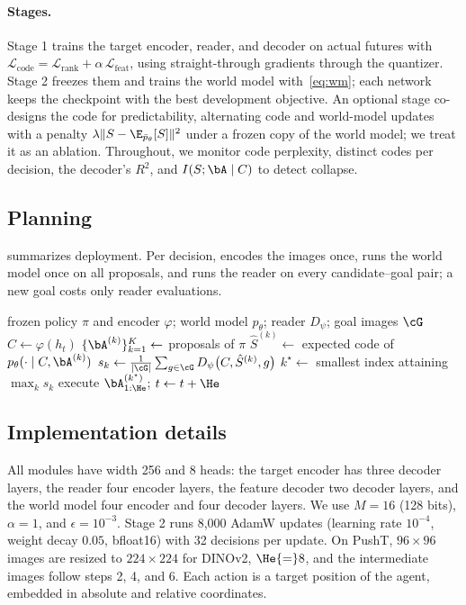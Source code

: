 \paragraph{Stages.}
Stage 1 trains the target encoder, reader, and decoder on actual futures with $\mathcal{L}_{\mathrm{code}}=\mathcal{L}_{\mathrm{rank}}+\alpha\,\mathcal{L}_{\mathrm{feat}}$, using straight-through gradients through the quantizer.
Stage 2 freezes them and trains the world model with~\eqref{eq:wm}; each network keeps the checkpoint with the best development objective.
An optional stage co-designs the code for predictability, alternating code and world-model updates with a penalty $\lambda\lVert S-\E_{\bar p_\theta}[S]\rVert^2$ under a frozen copy of the world model; we treat it as an ablation.
Throughout, we monitor code perplexity, distinct codes per decision, the decoder's $R^2$, and $I(S;\bA\mid C)$ to detect collapse.

\subsection{Planning}
\label{sec:planning}
 summarizes deployment.
Per decision, \method encodes the images once, runs the world model once on all proposals, and runs the reader on every candidate--goal pair; a new goal costs only reader evaluations.

\begin{algorithm}[t]
\caption{Selecting policy proposals with \method.}
\label{alg:cta}
\small
\begin{algorithmic}[1]
\Require frozen policy $\pi$ and encoder $\varphi$; world model $p_\theta$; reader $D_\psi$; goal images $\cG$
  \State $C\gets\varphi(h_t)$ 
  \State $\{\bA^{(k)}\}_{k=1}^{K}\gets$ proposals of $\pi$
  \State $\hat S^{(k)}\gets$ expected code of $p_\theta(\cdot\mid C,\bA^{(k)})$ 
  \State $s_k\gets\frac{1}{|\cG|}\sum_{g\in\cG}D_\psi\big(C,\hat S^{(k)},g\big)$
  \State $k^\star\gets$ smallest index attaining $\max_k s_k$ 
  \State execute $\bA^{(k^\star)}_{1:\He}$; $t\gets t+\He$
\EndWhile
\end{algorithmic}
\end{algorithm}

\subsection{Implementation details}
\label{sec:impl}
All modules have width 256 and 8 heads: the target encoder has three decoder layers, the reader four encoder layers, the feature decoder two decoder layers, and the world model four encoder and four decoder layers.
We use $M{=}16$ (128 bits), $\alpha{=}1$, and $\epsilon{=}10^{-3}$.
Stage 2 runs 8{,}000 AdamW updates (learning rate $10^{-4}$, weight decay $0.05$, bfloat16) with 32 decisions per update.
On PushT, $96{\times}96$ images are resized to $224{\times}224$ for DINOv2, $\He{=}8$, and the intermediate images follow steps 2, 4, and 6.
Each action is a target position of the agent, embedded in absolute and relative coordinates.
